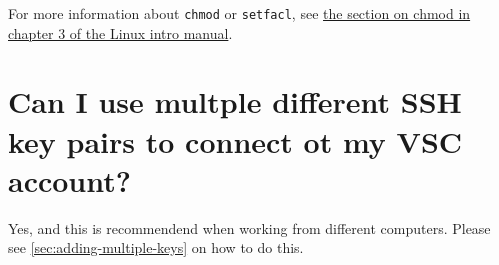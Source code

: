 For more information about \lstinline|chmod| or \lstinline|setfacl|, see \href{\LinuxManualURL#sec:chmod}
{the section on chmod in chapter 3 of the Linux intro manual}.

\section{Can I use multple different SSH key pairs to connect ot my VSC account?}

Yes, and this is recommendend when working from different computers. Please see
\autoref{sec:adding-multiple-keys} on how to do this.
